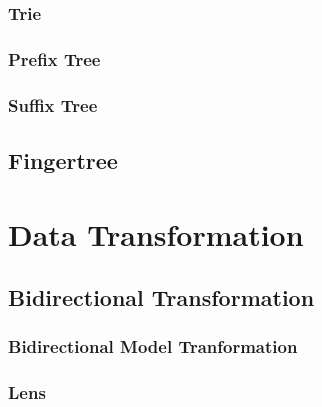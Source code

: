\subsubsection{Trie}\label{sec:trie}

\subsubsection{Prefix Tree}\label{sec:prefix_tree}

\subsubsection{Suffix Tree}\label{sec:suffix_tree}



\subsection{Fingertree}\label{sec:fingertree}



\section{Data Transformation}\label{sec:data_transformation}

\subsection{Bidirectional Transformation}
\label{sec:bidirectional_transformation}

\subsubsection{Bidirectional Model Tranformation}
\label{sec:bidirectional_model_transformation}

\subsubsection{Lens}\label{sec:lens}

